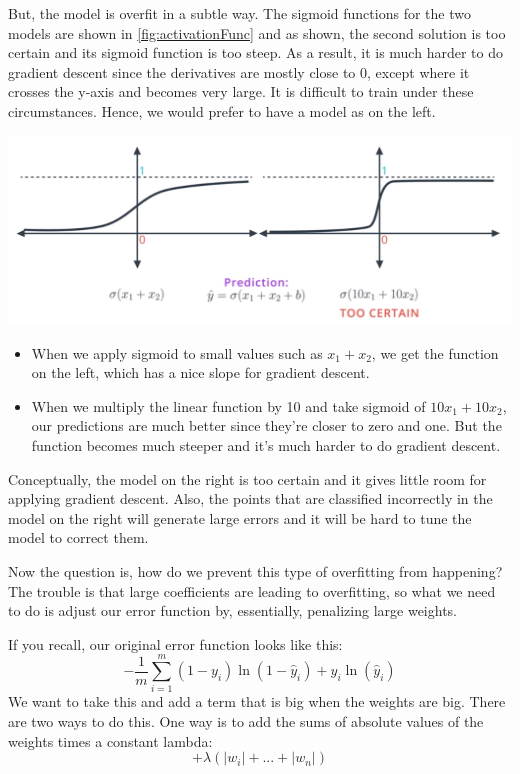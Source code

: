 But, the model is overfit in a subtle way. The sigmoid functions for the two models are shown in \ref{fig:activationFunc} and as shown, the second solution is too certain and its sigmoid function is too steep. As a result, it is much harder to do gradient descent since the derivatives are mostly close to 0, except where it crosses the y-axis and becomes very large. It is difficult to train under these circumstances. Hence, we would prefer to have a model as on the left.

\includegraphics[width=1\linewidth]{img//intro//trainingNN/actibation-functions.png}
\label{fig:activationFunc}


\begin{itemize}
    \item When we apply sigmoid to small values such as \(x_1 + x_2\), we get the function on the left, which has a nice slope for gradient descent.
    \item When we multiply the linear function by 10 and take sigmoid of \(10 x_1 + 10 x_2\), our predictions are much better since they're closer to zero and one. But the function becomes much steeper and it's much harder to do gradient descent.
\end{itemize}
Conceptually, the model on the right is too certain and it gives little room for applying gradient descent. Also, the points that are classified incorrectly in the model on the right will generate large errors and it will be hard to tune the model to correct them. \newline

Now the question is, how do we prevent this type of overfitting from happening? The trouble is that large coefficients are leading to overfitting, so what we need to do is adjust our error function by, essentially, penalizing large weights. \newline

If you recall, our original error function looks like this: \[-\frac{1}{m} \sum_{i = 1}^m (1 - y_i) \ln{(1 - \hat{y}_i)} + y_i \ln{(\hat{y}_i)}\]
We want to take this and add a term that is big when the weights are big. There are two ways to do this. One way is to add the sums of absolute values of the weights times a constant lambda: \[+ \lambda(|w_i| + ... + |w_n|)\]

